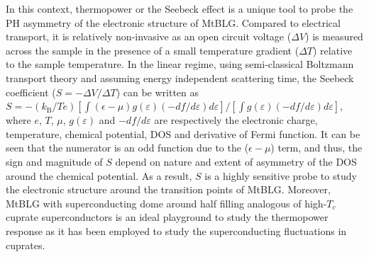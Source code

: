 \documentclass{nature}
\begin{document}
In this context, thermopower or the Seebeck effect is a unique %
tool to probe the PH asymmetry of the electronic structure of MtBLG. %
Compared to %
electrical transport, %
it is relatively non-invasive as an open circuit voltage ($\Delta V$) is measured across the sample in the presence of a small temperature gradient ($\Delta T$) relative to the sample temperature. In the linear regime, using semi-classical Boltzmann transport theory and assuming energy independent scattering time, the Seebeck coefficient ($S = -\Delta V/\Delta T$) can be written as $S=-(k_\mathrm{B}/Te)[\int (\epsilon-\mu)g(\varepsilon)(-df/d\varepsilon)d\varepsilon]/[\int g(\varepsilon)(-df/d\varepsilon)d\varepsilon]$, where $e$, $T$, $\mu$, $g(\varepsilon)$ and $-df/d\varepsilon$ are respectively the electronic charge, temperature, chemical potential, DOS and derivative of Fermi function. It can be seen that the numerator is an odd function due to the ($\epsilon-\mu$) term, and thus, the sign and magnitude of $S$ depend on nature and extent of asymmetry of the DOS around the chemical potential. %
As a result, $S$ is a highly sensitive probe to study the electronic structure around the %
transition points of MtBLG. %
Moreover, MtBLG with superconducting dome around half filling analogous %
of high-$T_c$ cuprate superconductors is an ideal playground to study the %
thermopower response %
as it has been employed to study the superconducting fluctuations in cuprates\cite{xu_vortex-like_2000}.
\end{document}
